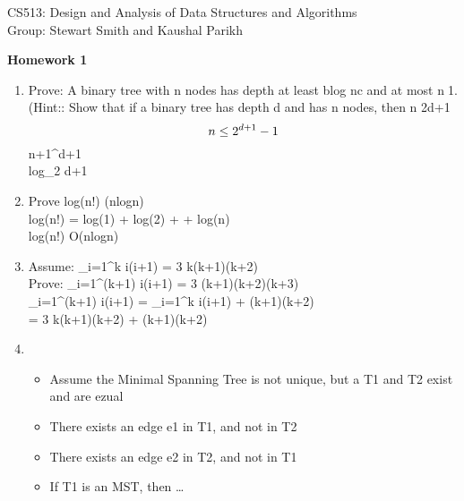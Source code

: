 \documentclass[11pt]{article}
\begin{document}
\sloppy

\noindent CS513: Design and Analysis of Data Structures and Algorithms \\
Group: Stewart Smith and Kaushal Parikh\\

\begin{center}
    \LARGE{\textbf{Homework 1}}\\
\end{center}

\vspace{.1in}

\begin{enumerate}


    \item Prove: A binary tree with n nodes has depth at least blog nc and at most n􀀀1. (Hint:: Show that if a binary tree has depth d and has n nodes, then n  2d+1 􀀀 \\
        $$n\leq 2^{d+1}-1\\
        $$n+1^{d+1}\\
        log_2 \leq d+1\\

    \item Prove log(n!) \in \Theta({nlogn})\\
        log(n!) = log(1) + log(2) + \cdots + log(n) \\
        log(n!) \in O(nlogn)\\

    \item Assume: \sum_{i=1}^k i(i+1) =  3 k(k+1)(k+2)\\
        Prove:  \sum_{i=1}^{(k+1)} i(i+1) =  3 (k+1)(k+2)(k+3)\\
        \sum_{i=1}^{(k+1)} i(i+1) = \sum_{i=1}^k i(i+1) + (k+1)(k+2)\\
        =  3 k(k+1)(k+2) + (k+1)(k+2)
    \item
        \begin{itemize}
            \item Assume the Minimal Spanning Tree is not unique, but a T1 and T2 exist and are ezual 
            \item There exists an edge e1 in T1, and not in T2 
            \item There exists an edge e2 in T2, and not in T1
            \item If T1 is an MST, then \ldots
        \end{itemize}
\end{enumerate}
\end{document}
